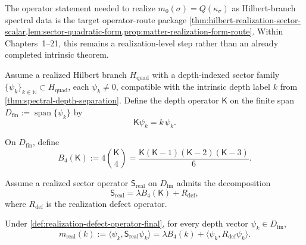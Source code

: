 \begin{remark}
\label{rem:intrinsic-spectral-law-operator-status}
The operator statement needed to realize
\(m_0(\sigma)=Q(\kappa_\sigma)\) as Hilbert-branch spectral data is the
target operator-route package
\cref{thm:hilbert-realization-sector-scalar,lem:sector-quadratic-form,prop:matter-realization-form-route}.
Within Chapters~1--21, this remains a realization-level step rather than an
already completed intrinsic theorem.
\end{remark}

\begin{definition}
\label{def:depth-operator}
Assume a realized Hilbert branch \(H_{\mathrm{quad}}\) with a depth-indexed
sector family \(\{\psi_k\}_{k\in\mathbb N}\subset H_{\mathrm{quad}}\), each
\(\psi_k\neq 0\), compatible with the intrinsic depth label
\(k\) from \cref{thm:spectral-depth-separation}.
Define the depth operator \(\mathsf K\) on the finite span
\(D_{\mathrm{fin}}:=\operatorname{span}\{\psi_k\}\) by
\[
  \mathsf K\psi_k=k\,\psi_k.
\]
\end{definition}

\begin{definition}
\label{def:quartic-backbone-operator}
On \(D_{\mathrm{fin}}\), define
\[
  B_4(\mathsf K)
  :=
  4\binom{\mathsf K}{4}
  =
  \frac{\mathsf K(\mathsf K-1)(\mathsf K-2)(\mathsf K-3)}{6}.
\]
\end{definition}

\begin{definition}
\label{def:realization-defect-operator-final}
Assume a realized sector operator \(\mathsf S_{\mathrm{real}}\) on
\(D_{\mathrm{fin}}\) admits
the decomposition
\[
  \mathsf S_{\mathrm{real}}=\lambda B_4(\mathsf K)+R_{\mathrm{def}},
\]
where \(R_{\mathrm{def}}\) is the realization defect operator.
\end{definition}

\begin{proposition}
\label{prop:realized-mass-decomposition}
Under
\cref{def:realization-defect-operator-final},
for every depth vector \(\psi_k\in D_{\mathrm{fin}}\),
\[
  m_{\mathrm{real}}(k)
  :=
  \langle \psi_k,\mathsf S_{\mathrm{real}}\psi_k\rangle
  =
  \lambda B_4(k)+\langle \psi_k,R_{\mathrm{def}}\psi_k\rangle.
\]
\end{proposition}

